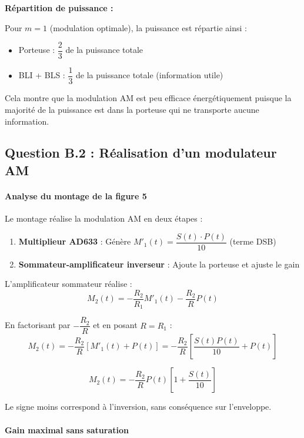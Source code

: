\documentclass[11pt,a4paper]{article}
\begin{document}
\textbf{Répartition de puissance :}

Pour $m = 1$ (modulation optimale), la puissance est répartie ainsi :
\begin{itemize}
    \item Porteuse : $\dfrac{2}{3}$ de la puissance totale
    \item BLI + BLS : $\dfrac{1}{3}$ de la puissance totale (information utile)
\end{itemize}

Cela montre que la modulation AM est peu efficace énergétiquement puisque la majorité de la puissance est dans la porteuse qui ne transporte aucune information.

\subsection{Question B.2 : Réalisation d'un modulateur AM}

\paragraph{Analyse du montage de la figure 5}

Le montage réalise la modulation AM en deux étapes :
\begin{enumerate}
    \item \textbf{Multiplieur AD633} : Génère $M'_1(t) = \dfrac{S(t) \cdot P(t)}{10}$ (terme DSB)
    \item \textbf{Sommateur-amplificateur inverseur} : Ajoute la porteuse et ajuste le gain
\end{enumerate}

L'amplificateur sommateur réalise :
\begin{equation}
M_2(t) = -\frac{R_2}{R_1} M'_1(t) - \frac{R_2}{R} P(t)
\end{equation}

En factorisant par $-\dfrac{R_2}{R}$ et en posant $R = R_1$ :
\begin{equation}
M_2(t) = -\frac{R_2}{R}[M'_1(t) + P(t)] = -\frac{R_2}{R}\left[\frac{S(t)P(t)}{10} + P(t)\right]
\end{equation}

\begin{equation}
M_2(t) = -\frac{R_2}{R} P(t)\left[1 + \frac{S(t)}{10}\right]
\end{equation}

Le signe moins correspond à l'inversion, sans conséquence sur l'enveloppe.

\paragraph{Gain maximal sans saturation}
\end{document}

